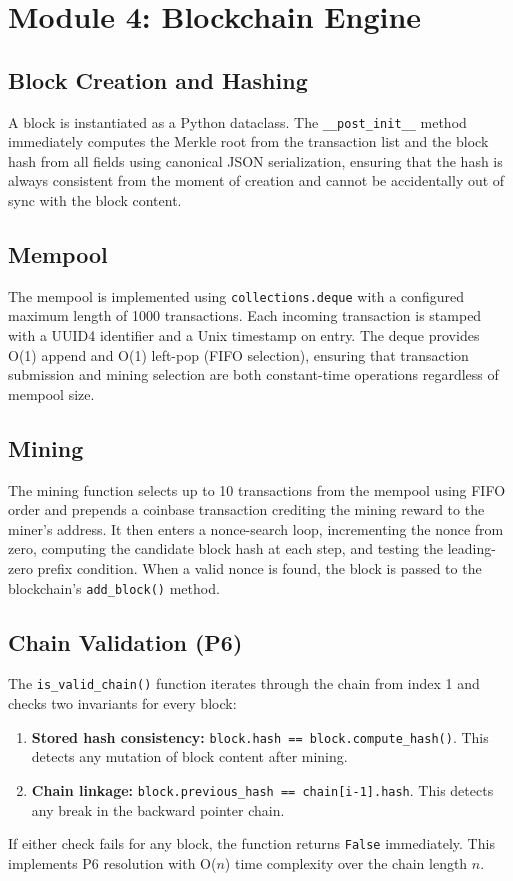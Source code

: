 \documentclass[12pt,a4paper]{report}
\begin{document}
\section{Module 4: Blockchain Engine}

\subsection{Block Creation and Hashing}

A block is instantiated as a Python dataclass. The \texttt{\_\_post\_init\_\_} method
immediately computes the Merkle root from the transaction list and the block hash from all
fields using canonical JSON serialization, ensuring that the hash is always consistent
from the moment of creation and cannot be accidentally out of sync with the block content.

\subsection{Mempool}

The mempool is implemented using \texttt{collections.deque} with a configured maximum
length of 1000 transactions. Each incoming transaction is stamped with a UUID4 identifier
and a Unix timestamp on entry. The deque provides O(1) append and O(1) left-pop (FIFO
selection), ensuring that transaction submission and mining selection are both constant-time
operations regardless of mempool size.

\subsection{Mining}

The mining function selects up to 10 transactions from the mempool using FIFO order and
prepends a coinbase transaction crediting the mining reward to the miner's address. It
then enters a nonce-search loop, incrementing the nonce from zero, computing the candidate
block hash at each step, and testing the leading-zero prefix condition. When a valid nonce
is found, the block is passed to the blockchain's \texttt{add\_block()} method.

\subsection{Chain Validation (P6)}

The \texttt{is\_valid\_chain()} function iterates through the chain from index 1 and checks
two invariants for every block:
\begin{enumerate}[label=\arabic*.]
  \item \textbf{Stored hash consistency:} \texttt{block.hash == block.compute\_hash()}. This
        detects any mutation of block content after mining.
  \item \textbf{Chain linkage:} \texttt{block.previous\_hash == chain[i-1].hash}. This detects
        any break in the backward pointer chain.
\end{enumerate}
If either check fails for any block, the function returns \texttt{False} immediately. This
implements P6 resolution with O($n$) time complexity over the chain length $n$.
\end{document}
